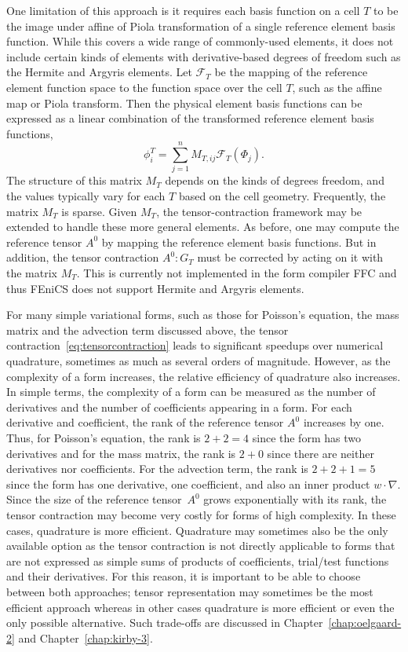 One limitation of this approach is it requires each basis function on
a cell \( T \) to be the image under affine of Piola transformation of
a single reference element basis function.  While this covers a wide
range of commonly-used elements, it does not include certain kinds of
elements with derivative-based degrees of freedom such as the Hermite
and Argyris elements. Let \( \mathcal{F}_T \) be the mapping of the
reference element function space to the function space over the cell
$T$, such as the affine map or Piola transform. Then the physical
element basis functions can be expressed as a linear combination of
the transformed reference element basis functions,
\begin{equation}
\phi^T_i = \sum_{j=1}^n M_{T,{ij}} \mathcal{F}_T \left( \Phi_j \right).
\end{equation}
The structure of this matrix \( M_T \) depends on the kinds of degrees
freedom, and the values typically vary for each \( T \) based on the
cell geometry.  Frequently, the matrix $M_T$ is sparse. Given \( M_T
\), the tensor-contraction framework may be extended to handle these
more general elements.  As before, one may compute the reference
tensor \( A^0 \) by mapping the reference element basis functions. But
in addition, the tensor contraction \( A^0 : G_T \) must be corrected
by acting on it with the matrix \( M_T \). This is currently not
implemented in the form compiler FFC and thus FEniCS does not support
Hermite and Argyris elements.

For many simple variational forms, such as those for Poisson's
equation, the mass matrix and the advection term discussed above, the
tensor contraction~\eqref{eq:tensorcontraction} leads to significant
speedups over numerical quadrature, sometimes as much as several
orders of magnitude.  However, as the complexity of a form increases,
the relative efficiency of quadrature also increases. In simple terms,
the complexity of a form can be measured as the number of derivatives
and the number of coefficients appearing in a form. For each
derivative and coefficient, the rank of the reference tensor $A^0$
increases by one. Thus, for Poisson's equation, the rank is $2 + 2 =
4$ since the form has two derivatives and for the mass matrix, the
rank is $2 + 0$ since there are neither derivatives nor
coefficients. For the advection term, the rank is $2 + 2 + 1 = 5$
since the form has one derivative, one coefficient, and also an inner
product $w \cdot \nabla$. Since the size of the reference tensor~$A^0$
grows exponentially with its rank, the tensor contraction may become
very costly for forms of high complexity. In these cases, quadrature
is more efficient. Quadrature may sometimes also be the only available
option as the tensor contraction is not directly applicable to forms
that are not expressed as simple sums of products of coefficients,
trial/test functions and their derivatives. For this reason, it is
important to be able to choose between both approaches; tensor
representation may sometimes be the most efficient approach whereas in
other cases quadrature is more efficient or even the only possible
alternative.  Such trade-offs are discussed in
Chapter~\ref{chap:oelgaard-2} and Chapter~\ref{chap:kirby-3}.
